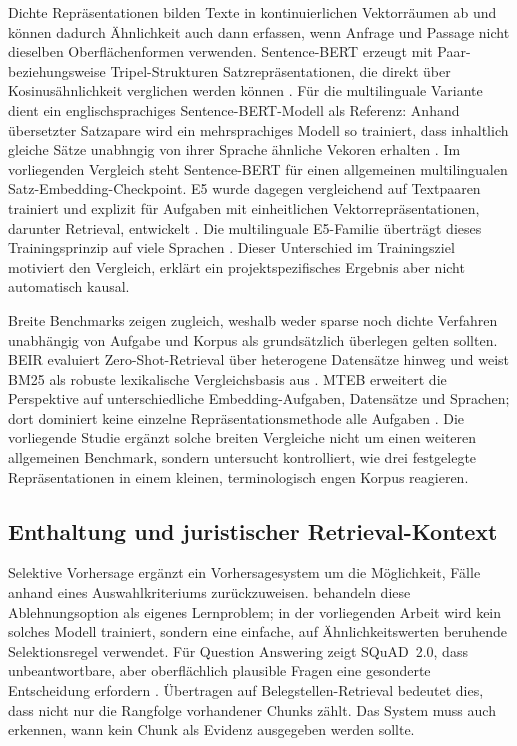 \documentclass[11pt]{article}
\begin{document}
Dichte Repräsentationen bilden Texte in kontinuierlichen Vektorräumen ab und können dadurch Ähnlichkeit auch dann erfassen, wenn Anfrage und Passage nicht dieselben Oberflächenformen verwenden. Sentence-BERT erzeugt mit Paar- beziehungsweise Tripel-Strukturen Satzrepräsentationen, die direkt über Kosinusähnlichkeit verglichen werden können \citep{reimers-gurevych-2019-sentence}. Für die multilinguale Variante dient ein englischsprachiges Sentence-BERT-Modell als Referenz: Anhand übersetzter Satzapare wird ein mehrsprachiges Modell so trainiert, dass inhaltlich gleiche Sätze unabhngig von ihrer Sprache ähnliche Vekoren erhalten \citep{reimers-gurevych-2020-making}. Im vorliegenden Vergleich steht Sentence-BERT für einen allgemeinen multilingualen Satz-Embedding-Checkpoint. E5 wurde dagegen vergleichend auf Textpaaren trainiert und explizit für Aufgaben mit einheitlichen Vektorrepräsentationen, darunter Retrieval, entwickelt \citep{wang2022text}. Die multilinguale E5-Familie überträgt dieses Trainingsprinzip auf viele Sprachen \citep{wang2024multilingual}. Dieser Unterschied im Trainingsziel motiviert den Vergleich, erklärt ein projektspezifisches Ergebnis aber nicht automatisch kausal.

Breite Benchmarks zeigen zugleich, weshalb weder sparse noch dichte Verfahren unabhängig von Aufgabe und Korpus als grundsätzlich überlegen gelten sollten. BEIR evaluiert Zero-Shot-Retrieval über heterogene Datensätze hinweg und weist BM25 als robuste lexikalische Vergleichsbasis aus \citep{thakur2021beir}. MTEB erweitert die Perspektive auf unterschiedliche Embedding-Aufgaben, Datensätze und Sprachen; dort dominiert keine einzelne Repräsentationsmethode alle Aufgaben \citep{muennighoff-etal-2023-mteb}. Die vorliegende Studie ergänzt solche breiten Vergleiche nicht um einen weiteren allgemeinen Benchmark, sondern untersucht kontrolliert, wie drei festgelegte Repräsentationen in einem kleinen, terminologisch engen Korpus reagieren.

\subsection{Enthaltung und juristischer Retrieval-Kontext}

Selektive Vorhersage ergänzt ein Vorhersagesystem um die Möglichkeit, Fälle anhand eines Auswahlkriteriums zurückzuweisen. \citet{pmlr-v97-geifman19a} behandeln diese Ablehnungsoption als eigenes Lernproblem; in der vorliegenden Arbeit wird kein solches Modell trainiert, sondern eine einfache, auf Ähnlichkeitswerten beruhende Selektionsregel verwendet. Für Question Answering zeigt SQuAD~2.0, dass unbeantwortbare, aber oberflächlich plausible Fragen eine gesonderte Entscheidung erfordern \citep{rajpurkar-etal-2018-know}. Übertragen auf Belegstellen-Retrieval bedeutet dies, dass nicht nur die Rangfolge vorhandener Chunks zählt. Das System muss auch erkennen, wann kein Chunk als Evidenz ausgegeben werden sollte.
\end{document}
